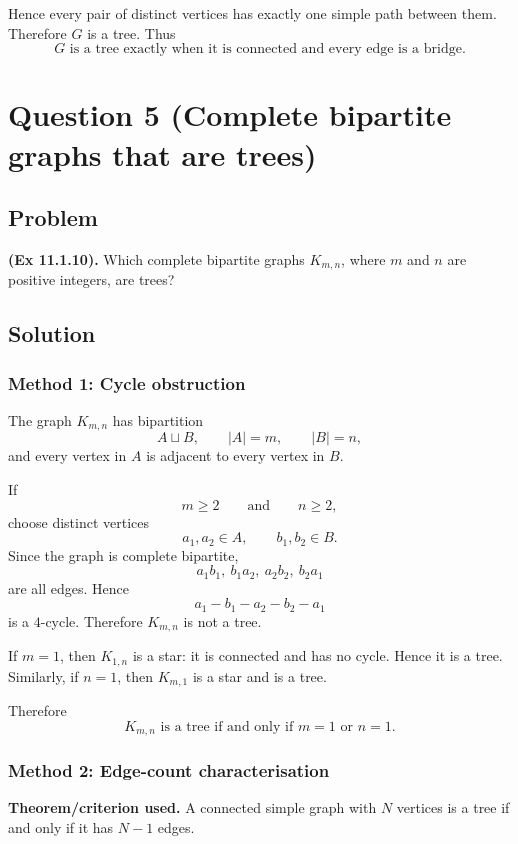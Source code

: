 \documentclass[12pt]{article}
\begin{document}
Hence every pair of distinct vertices has exactly one simple path between them. Therefore $G$ is a tree. Thus
\[
  \boxed{G\text{ is a tree exactly when it is connected and every edge is a bridge}.}
\]

\newpage
\section{Question 5 (Complete bipartite graphs that are trees)}

\subsection{Problem}
\textbf{(Ex 11.1.10).} Which complete bipartite graphs $K_{m,n}$, where $m$ and $n$ are positive integers, are trees?

\subsection{Solution}

\subsubsection{Method 1: Cycle obstruction}
The graph $K_{m,n}$ has bipartition
\[
  A\sqcup B,
  \qquad |A|=m,\qquad |B|=n,
\]
and every vertex in $A$ is adjacent to every vertex in $B$.

If
\[
  m\ge 2
  \qquad\text{and}\qquad
  n\ge 2,
\]
choose distinct vertices
\[
  a_1,a_2\in A,
  \qquad
  b_1,b_2\in B.
\]
Since the graph is complete bipartite,
\[
  a_1b_1,\ b_1a_2,\ a_2b_2,\ b_2a_1
\]
are all edges. Hence
\[
  a_1-b_1-a_2-b_2-a_1
\]
is a $4$-cycle. Therefore $K_{m,n}$ is not a tree.

If $m=1$, then $K_{1,n}$ is a star: it is connected and has no cycle. Hence it is a tree. Similarly, if $n=1$, then $K_{m,1}$ is a star and is a tree.

Therefore
\[
  \boxed{K_{m,n}\text{ is a tree if and only if }m=1\text{ or }n=1.}
\]

\subsubsection{Method 2: Edge-count characterisation}
\textbf{Theorem/criterion used.} A connected simple graph with $N$ vertices is a tree if and only if it has $N-1$ edges.
\end{document}
